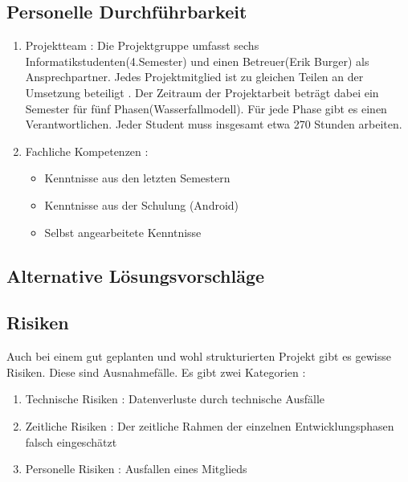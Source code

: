 \documentclass[parskip=full]{scrartcl}
\begin{document}
	\subsection{Personelle Durchführbarkeit}
	\begin{enumerate}[label={\alph*)}]
		\item Projektteam : Die Projektgruppe umfasst sechs Informatikstudenten(4.Semester) und einen Betreuer(Erik Burger) als Ansprechpartner.  Jedes Projektmitglied ist  zu gleichen Teilen an der Umsetzung beteiligt . Der Zeitraum der Projektarbeit beträgt dabei ein Semester für fünf Phasen(Wasserfallmodell). Für jede Phase gibt es einen  Verantwortlichen. Jeder  Student muss insgesamt etwa  270 Stunden arbeiten.
		\item Fachliche Kompetenzen : 
		\begin{itemize}
			\item Kenntnisse aus den letzten Semestern
			\item Kenntnisse aus der Schulung (Android)
			\item Selbst angearbeitete Kenntnisse
		\end{itemize}
	\end{enumerate}
	
	\subsection{Alternative Lösungsvorschläge}
	\subsection{Risiken} 
	Auch bei einem gut geplanten und wohl strukturierten Projekt gibt es gewisse Risiken. Diese sind Ausnahmefälle. Es gibt zwei \gls{Kategorie}n :
	\begin{enumerate}[label={\alph*)}]
		\item Technische Risiken : Datenverluste durch technische Ausfälle
		\item Zeitliche Risiken : Der zeitliche Rahmen der einzelnen Entwicklungsphasen falsch eingeschätzt
		\item Personelle Risiken : Ausfallen eines Mitglieds
	\end{enumerate}
	\newpage
	
	
	\printnoidxglossaries
	
\end{document}
